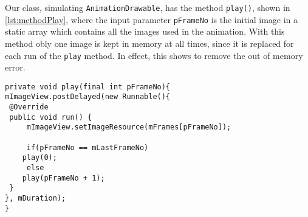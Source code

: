 Our class, simulating \lstinline{AnimationDrawable}, has the method \lstinline{play()}, shown in \cref{lst:methodPlay}, where the input parameter \lstinline{pFrameNo} is the initial image in a static array which contains all the images used in the animation. 
With this method obly one image is kept in memory at all times, since it is replaced for each run of the \lstinline{play} method.
In effect, this shows to remove the out of memory error.

\begin{lstlisting}[caption={Improved implementation of handling the animation.},label={lst:methodPlay}]
private void play(final int pFrameNo){
mImageView.postDelayed(new Runnable(){
 @Override
 public void run() {                    
	 mImageView.setImageResource(mFrames[pFrameNo]);
	
	 if(pFrameNo == mLastFrameNo)
    play(0);
	 else
    play(pFrameNo + 1);
 }
}, mDuration);
}        
\end{lstlisting}